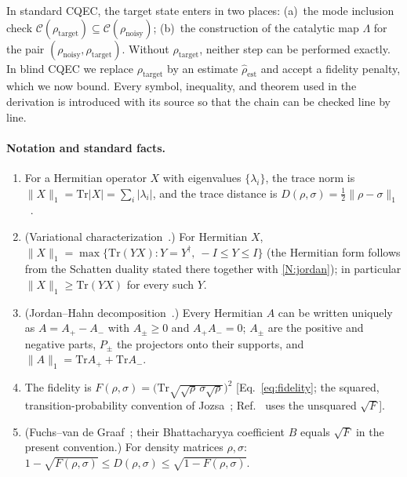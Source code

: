 \documentclass[12pt,a4paper]{article}
\newcommand{\CC}{\mathcal{C}}
\newcommand{\tr}{\mathrm{Tr}}
\newcommand{\rhot}{\rho_\mathrm{target}}
\newcommand{\rhon}{\rho_\mathrm{noisy}}
\newcommand{\rhoe}{\hat{\rho}_\mathrm{est}}
\begin{document}
In standard CQEC, the target state enters in two places:
(a)~the mode inclusion check $\CC(\rhot) \subseteq \CC(\rhon)$;
(b)~the construction of the catalytic map $\Lambda$ for the pair $(\rhon,\rhot)$.
Without $\rhot$, neither step can be performed exactly.
In blind CQEC we replace $\rhot$ by an estimate $\rhoe$ and accept a fidelity penalty, which we now bound.
Every symbol, inequality, and theorem used in the derivation is introduced with its source so that the chain can be checked line by line.

\paragraph{Notation and standard facts.}
\begin{enumerate}[label=(N\arabic*),leftmargin=3em]
\item \label{N:norm} For a Hermitian operator $X$ with eigenvalues $\{\lambda_i\}$, the trace norm is $\|X\|_1 = \tr|X| = \sum_i |\lambda_i|$, and the trace distance is $D(\rho,\sigma) = \tfrac12\|\rho - \sigma\|_1$~\cite[Sec.~9.2]{NielsenChuang2010}.
\item \label{N:dual} (Variational characterization~\cite[Sec.~1.1.3, Eqs.~(1.173) and~(1.182)]{Watrous2018}.) For Hermitian $X$, $\|X\|_1 = \max\{\tr(YX) : Y = Y^\dagger,\ -I \leq Y \leq I\}$ (the Hermitian form follows from the Schatten duality stated there together with \ref{N:jordan}); in particular $\|X\|_1 \geq \tr(YX)$ for every such $Y$.
\item \label{N:jordan} (Jordan--Hahn decomposition~\cite[Sec.~1.1.3, Eqs.~(1.143)--(1.144)]{Watrous2018}.) Every Hermitian $A$ can be written uniquely as $A = A_+ - A_-$ with $A_\pm \geq 0$ and $A_+A_- = 0$; $A_\pm$ are the positive and negative parts, $P_\pm$ the projectors onto their supports, and $\|A\|_1 = \tr A_+ + \tr A_-$.
\item \label{N:fid} The fidelity is $F(\rho,\sigma) = \bigl(\tr\sqrt{\sqrt\rho\,\sigma\sqrt\rho}\bigr)^2$ [Eq.~\eqref{eq:fidelity}; the squared, transition-probability convention of Jozsa~\cite{Jozsa1994}; Ref.~\cite{NielsenChuang2010} uses the unsquared $\sqrt{F}$].
\item \label{N:fvg} (Fuchs--van de Graaf~\cite[Thm.~1, Eq.~(46)]{FuchsGraaf1999}; their Bhattacharyya coefficient $B$ equals $\sqrt{F}$ in the present convention.) For density matrices $\rho,\sigma$: $1 - \sqrt{F(\rho,\sigma)} \leq D(\rho,\sigma) \leq \sqrt{1 - F(\rho,\sigma)}$.
\end{enumerate}
\end{document}
